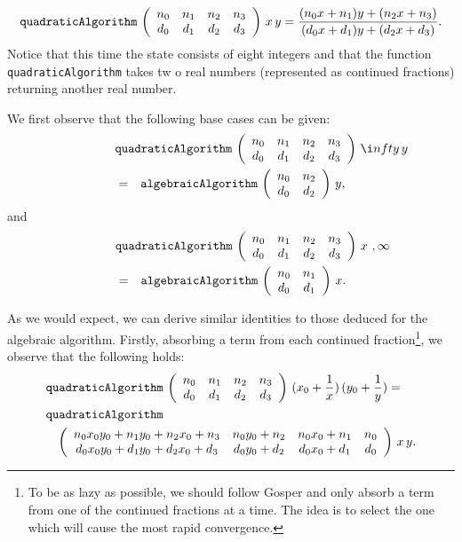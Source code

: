 \[\mbox{\tt quadraticAlgorithm}\indexTT{quadraticAlgorithm}\,
\left(\begin{array}{cccc}n_0&n_1&n_2&n_3\\d_0&d_1&d_2&d_3\end{array}\right)\, x
\,y = 
\frac{(n_0x+n_1)y+(n_2x+n_3)}{(d_0x+d_1)y+(d_2x+d_3)}.\]
Notice that this time the state consists of eight integers and that
the function \mbox{\tt quadraticAlgorithm} takes tw
o real numbers (represented as continued
fractions) returning another real number.

We first observe that the following base cases can be given:
\begin{eqnarray*}
\lefteqn{\mbox{\tt quadraticAlgorithm}\indexTT{quadraticAlgorithm}\,
\left(\begin{array}{cccc}n_0&n_1&n_2&n_3\\d_0&d_1&d_2&d_3\end{array}\right)\,\i
nfty\,y}\\
 &= &
\mbox{\tt algebraicAlgorithm}\indexTT{algebraicAlgorithm}\,
\left(\begin{array}{cc}n_0&n_2\\d_0&d_2\end{array}\right)\,y,
\end{eqnarray*}
and
\begin{eqnarray*}
\lefteqn{\mbox{\tt quadraticAlgorithm}\indexTT{quadraticAlgorithm}\,
\left(\begin{array}{cccc}n_0&n_1&n_2&n_3\\d_0&d_1&d_2&d_3\end{array}\right)\,x\
,\infty}\\
& =&
\mbox{\tt algebraicAlgorithm}\indexTT{algebraicAlgorithm}\,
\left(\begin{array}{cc}n_0&n_1\\d_0&d_1\end{array}\right)\,x.
\end{eqnarray*}

As we would expect, we can derive similar identities to those deduced
for the algebraic algorithm. Firstly, absorbing a term from each
continued fraction\footnote{To be as lazy as possible, we should
follow Gosper\shortcite{GOSPER81a} and only absorb a term from one of the
continued fractions at a time. The idea is to select the one which
will cause the most rapid convergence.}, we observe that the following
holds:
\begin{eqnarray*}
\lefteqn{\mbox{\tt quadraticAlgorithm}\indexTT{quadraticAlgorithm}\,
\left(\begin{array}{cccc}n_0&n_1&n_2&n_3\\d_0&d_1&d_2&d_3\end{array}\right)
\,(x_0+\frac{1}{x})
\,(y_0+\frac{1}{y})=}\\
\lefteqn{\mbox{\tt quadraticAlgorithm}\indexTT{quadraticAlgorithm}}\\
&&\left(\begin{array}{cccc}
n_0x_0y_0+n_1y_0+n_2x_0+n_3&n_0y_0+n_2&n_0x_0+n_1&n_0\\
d_0x_0y_0+d_1y_0+d_2x_0+d_3&d_0y_0+d_2&d_0x_0+d_1&d_0
\end{array}\right)\,x\,y.\end{eqnarray*}

